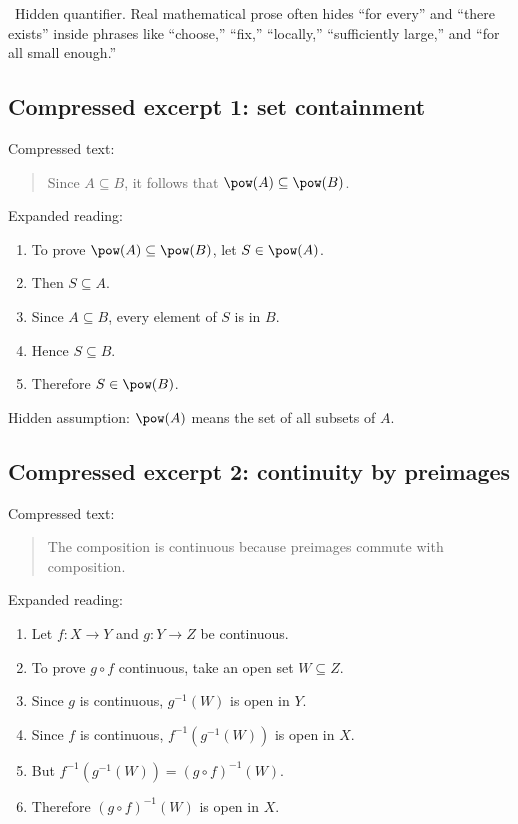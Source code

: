 \begin{marginnotebox}
\motifhiddenquantifier\ Hidden quantifier. Real mathematical prose often hides
``for every'' and ``there exists'' inside phrases like ``choose,'' ``fix,''
``locally,'' ``sufficiently large,'' and ``for all small enough.''
\end{marginnotebox}

\subsection{Compressed excerpt 1: set containment}

Compressed text:

\begin{quote}
Since $A\subseteq B$, it follows that $\pow(A)\subseteq\pow(B)$.
\end{quote}

Expanded reading:

\begin{enumerate}
\item To prove $\pow(A)\subseteq\pow(B)$, let $S\in\pow(A)$.
\item Then $S\subseteq A$.
\item Since $A\subseteq B$, every element of $S$ is in $B$.
\item Hence $S\subseteq B$.
\item Therefore $S\in\pow(B)$.
\end{enumerate}

Hidden assumption: $\pow(A)$ means the set of all subsets of $A$.

\subsection{Compressed excerpt 2: continuity by preimages}

Compressed text:

\begin{quote}
The composition is continuous because preimages commute with composition.
\end{quote}

Expanded reading:

\begin{enumerate}
\item Let $f:X\to Y$ and $g:Y\to Z$ be continuous.
\item To prove $g\circ f$ continuous, take an open set $W\subseteq Z$.
\item Since $g$ is continuous, $g^{-1}(W)$ is open in $Y$.
\item Since $f$ is continuous, $f^{-1}(g^{-1}(W))$ is open in $X$.
\item But $f^{-1}(g^{-1}(W))=(g\circ f)^{-1}(W)$.
\item Therefore $(g\circ f)^{-1}(W)$ is open in $X$.
\end{enumerate}

